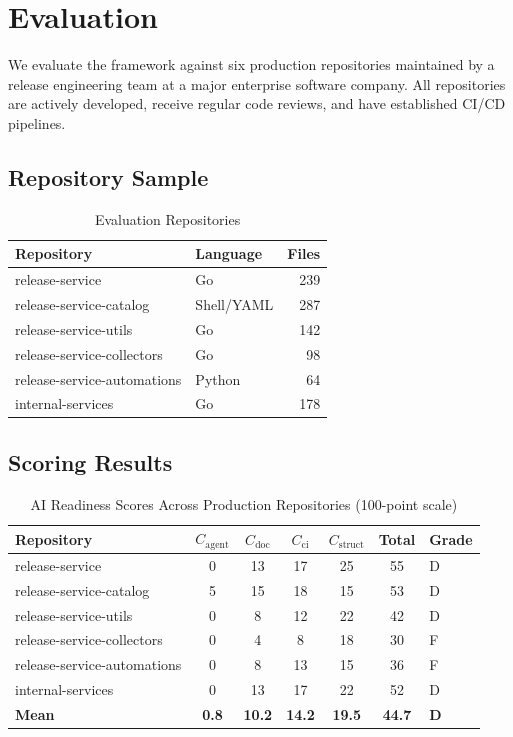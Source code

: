 \documentclass[11pt,twocolumn]{article}
\begin{document}
\section{Evaluation}
\label{sec:evaluation}

We evaluate the framework against six production repositories maintained
by a release engineering team at a major enterprise software company. All
repositories are actively developed, receive regular code reviews, and
have established CI/CD pipelines.

\subsection{Repository Sample}

\begin{table}[H]
\centering
\caption{Evaluation Repositories}
\label{tab:repos}
\begin{tabular}{@{}llr@{}}
\toprule
\textbf{Repository} & \textbf{Language} & \textbf{Files} \\
\midrule
release-service & Go & 239 \\
release-service-catalog & Shell/YAML & 287 \\
release-service-utils & Go & 142 \\
release-service-collectors & Go & 98 \\
release-service-automations & Python & 64 \\
internal-services & Go & 178 \\
\bottomrule
\end{tabular}
\end{table}

\subsection{Scoring Results}

\begin{table}[t]
\centering
\caption{AI Readiness Scores Across Production Repositories (100-point scale)}
\label{tab:results}
\begin{tabular}{@{}lcccccl@{}}
\toprule
\textbf{Repository} & $C_{\text{agent}}$ & $C_{\text{doc}}$ & $C_{\text{ci}}$ & $C_{\text{struct}}$ & \textbf{Total} & \textbf{Grade} \\
\midrule
release-service           & 0  & 13 & 17 & 25 & 55 & D \\
release-service-catalog   & 5  & 15 & 18 & 15 & 53 & D \\
release-service-utils     & 0  & 8  & 12 & 22 & 42 & D \\
release-service-collectors& 0  & 4  & 8  & 18 & 30 & F \\
release-service-automations& 0 & 8  & 13 & 15 & 36 & F \\
internal-services         & 0  & 13 & 17 & 22 & 52 & D \\
\midrule
\textbf{Mean}             & \textbf{0.8} & \textbf{10.2} & \textbf{14.2} & \textbf{19.5} & \textbf{44.7} & \textbf{D} \\
\bottomrule
\end{tabular}
\end{table}
\end{document}
